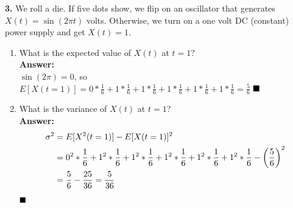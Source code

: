 \textbf{3.} We roll a die.  If five dots show, we flip on an oscillator that generates $X(t) = \sin (2 \pi t)$ volts.  Otherwise, we turn on a one volt DC (constant) power supply and get $X(t)=1$.
  \begin{enumerate}
  \item  What is the expected value of $X(t)$ at $t=1$?\\
    \textbf{Answer:}\\
    $\sin(2\pi) = 0$, so $E[X(t=1)] = 0 * \frac{1}{6} + 1* \frac{1}{6} + 1* \frac{1}{6}  + 1* \frac{1}{6}  + 1* \frac{1}{6}  + 1* \frac{1}{6}  = \frac{5}{6}$ $\hfill\blacksquare$\\

  \item  What is the variance of $X(t)$ at $t=1$?\\
    \textbf{Answer:}\\
    \begin{align*}
      \sigma^2 & = E[X^2(t=1)] - E[X(t=1)]^2\\
               & = 0^2 * \frac{1}{6} + 1^2* \frac{1}{6} + 1^2* \frac{1}{6}  + 1^2* \frac{1}{6}  + 1^2* \frac{1}{6}  + 1^2* \frac{1}{6} - \left(\dfrac{5}{6}\right)^2 \\
               & = \dfrac{5}{6} - \dfrac{25}{36} = \dfrac{5}{36}
    \end{align*} $\hfill\blacksquare$


\end{enumerate}
